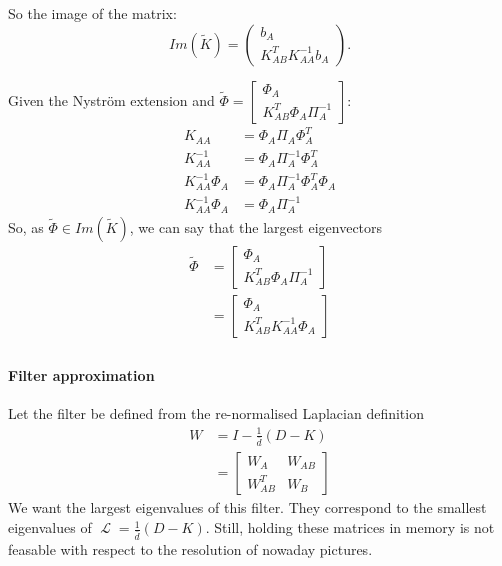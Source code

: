 \documentclass[]{article}
\DeclareMathOperator{\Lapl}{\mathcal{L}}
\begin{document}
So the image of the matrix:
\[Im(\tilde{K}) = \begin{pmatrix}
 b_A \\
 K_{AB}^T K_{AA}^{-1} b_A
\end{pmatrix}.\]

Given the Nystr\"om extension \cite{fowlkes_spectral_2004} and \cite{glide_2014} \(\tilde{\Phi} = \begin{bmatrix}\Phi_A \\ K_{AB}^T \Phi_A \Pi_A^{-1}\end{bmatrix}\):
\begin{equation}
 \begin{split}
  K_{AA} & = \Phi_A \Pi_A \Phi_A^T \\
  K_{AA}^{-1} & = \Phi_A \Pi_A^{-1} \Phi_A^T \\
  K_{AA}^{-1} \Phi_A & = \Phi_A \Pi_A^{-1} \Phi_A^T \Phi_A \\
  K_{AA}^{-1} \Phi_A & = \Phi_A \Pi_A^{-1}
 \end{split}
\end{equation}
So, as \(\tilde{\Phi} \in Im(\tilde{K})\), we can say that the largest eigenvectors
\begin{equation}
 \begin{split}
  \tilde{\Phi} & = \begin{bmatrix}\Phi_A \\ K_{AB}^T \Phi_A \Pi_A^{-1}\end{bmatrix} \\
               & = \begin{bmatrix}\Phi_A \\ K_{AB}^T K_{AA}^{-1} \Phi_A\end{bmatrix} \\
 \end{split}
\end{equation}

\paragraph{Filter approximation}

Let the filter be defined from the re-normalised Laplacian definition
\begin{equation}
 \begin{split}
  W & = I  - \frac{1}{\bar{d}} (D - K) \\
    & = \begin{bmatrix}
         W_A & W_{AB} \\
         W_{AB}^T & W_B
        \end{bmatrix}
 \end{split}
\end{equation}
We want the largest eigenvalues of this filter.
They correspond to the smallest eigenvalues of \(\Lapl = \frac{1}{\bar{d}} (D - K)\).
Still, holding these matrices in memory is not feasable with respect to the resolution of nowaday pictures.
\end{document}

